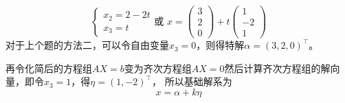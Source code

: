 \begin{solution}
\[\begin{cases}
            x_2 = 2-2t \\
            x_3 = t
        \end{cases}
        \text{或~}
        x =
        \begin{pmatrix}
            3 \\2\\0
        \end{pmatrix}
        +t
        \begin{pmatrix}
            1 \\-2\\1
        \end{pmatrix}
    \]
    对于上个题的方法二，可以令自由变量$x_3=0$，则得特解$\alpha=(3,2,0)^\intercal$。

    再令化简后的方程组$AX=b$变为齐次方程组$AX=0$然后计算齐次方程组的解向量，即令$x_3=1$，得$\eta=(1,-2)^\intercal$，
    所以基础解系为
    \[ x= \alpha + k\eta \]
\end{solution}

